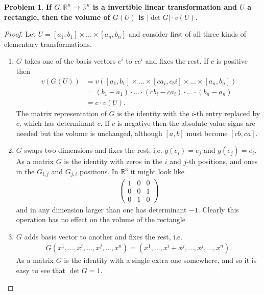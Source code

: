 \documentclass[20pt]{article}
\theoremstyle{plain}
\theoremstyle{definition}
\newtheorem*{problem}{Problem}
\newcommand{\reals}{\mathbb{R}}
\begin{document}
\begin{problem}{3.35}
  \textbf{If $G: \reals^n \to \reals^n$ is a invertible linear transformation and $U$ a
  rectangle, then the volume of $G(U)$ is $|\det G|\cdot v(U).$}
\end{problem}

\begin{proof}
  Let $U = [a_1, b_1] \times ... \times [a_n, b_n]$
  and consider first of all three kinds of elementary transformations.
  \begin{enumerate}
     \item $G$ takes one of the basis vectors $e^i$ to $ce^i$ and fixes the rest.
     If $c$ is positive then
     \begin{align*}
       v(G(U))
       &= v([a_1, b_1]\times...\times[ca_i, c_bi]\times...\times[a_n, b_n]) \\
       &= (b_1 - a_1)\cdot...\cdot(cb_i - ca_i)\cdot ... \cdot(b_n-a_n) \\
       &= c\cdot v(U).
     \end{align*}
     The matrix representation of $G$ is the identity with the $i$-th
     entry replaced by $c$, which has determinant $c.$
     If $c$ is negative then the absolute value signs are needed but
     the volume is unchanged, although $[a, b]$ must become $[cb, ca]$.

     \item $G$ swaps two dimensions and fixes the rest, i.e.
     $g(e_i) = e_j$ and $g(e_j) =e_i.$
     As a matrix $G$ is the identity with zeros in the $i$ and $j$-th positions,
     and ones in the $G_{i, j}$ and $G_{j,i}$ positions.  In $\reals^3$ it might look like
     \begin{align*}
       \begin{pmatrix}
         1 & 0 & 0 \\
         0 & 0 & 1 \\
         0 & 1 & 0
       \end{pmatrix}
     \end{align*}
     and in any dimension larger than one has determinant $-1.$
     Clearly this operation has no effect on the volume of the rectangle

     \item $G$ adds basis vector to another and fixes the rest, i.e.
     \begin{align*}
       G(x^1,..., x^i,..., x^j,..., x^n) = (x^1,..., x^i + x^j,..., x^j,..., x^n).
     \end{align*}
     As a matrix $G$ is the identity with a single extra one somewhere, and so it is easy to
     see that $\det G = 1$.



\end{enumerate}
\end{proof}
\end{document}
